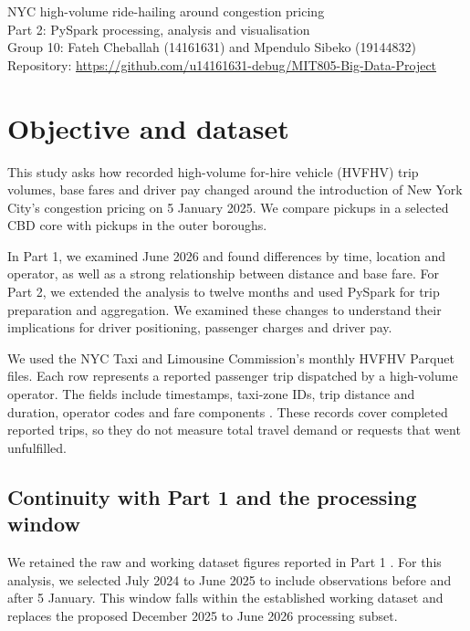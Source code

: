 \documentclass[10pt,a4paper]{article}
\begin{document}
\begin{center}
{\Large NYC high-volume ride-hailing around congestion pricing}\\[4pt]
{\large Part 2: PySpark processing, analysis and visualisation}\\[7pt]
Group 10: Fateh Cheballah (14161631) and Mpendulo Sibeko (19144832)\\[3pt]
\small Repository: \url{https://github.com/u14161631-debug/MIT805-Big-Data-Project}
\end{center}

\section{Objective and dataset}

This study asks how recorded high-volume for-hire vehicle (HVFHV) trip volumes, base fares and driver pay changed around the introduction of New York City's congestion pricing on 5 January 2025. We compare pickups in a selected CBD core with pickups in the outer boroughs.

In Part 1, we examined June 2026 and found differences by time, location and operator, as well as a strong relationship between distance and base fare. For Part 2, we extended the analysis to twelve months and used PySpark for trip preparation and aggregation. We examined these changes to understand their implications for driver positioning, passenger charges and driver pay.

We used the NYC Taxi and Limousine Commission's monthly HVFHV Parquet files. Each row represents a reported passenger trip dispatched by a high-volume operator. The fields include timestamps, taxi-zone IDs, trip distance and duration, operator codes and fare components \cite{tlc,dictionary}. These records cover completed reported trips, so they do not measure total travel demand or requests that went unfulfilled.

\subsection{Continuity with Part 1 and the processing window}

We retained the raw and working dataset figures reported in Part 1 \cite{part1}. For this analysis, we selected July 2024 to June 2025 to include observations before and after 5 January. This window falls within the established working dataset and replaces the proposed December 2025 to June 2026 processing subset.
\end{document}
